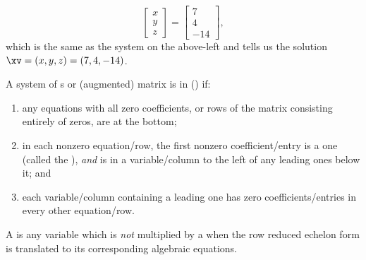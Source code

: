 \begin{example}
\begin{solution}
\begin{equation*}
\begin{bmatrix} x\\y\\z \end{bmatrix}
=\begin{bmatrix} 7\\4\\-14 \end{bmatrix},
\end{equation*}
which is the same as the system on the above-left and tells us the solution \(\xv=(x,y,z)=(7,4,-14)\).
\end{solution}
\end{example}





\begin{definition} \label{def:rref} 
 A system of s or (augmented) matrix is in  (\rref) if:
  \begin{enumerate}
\item any equations with all zero coefficients, or rows of the matrix consisting entirely of zeros, are at the bottom; 
\item in each nonzero equation\slash row, the first nonzero coefficient\slash entry is a one (called the ), \emph{and} is in a variable\slash column to the left of any leading ones below it;
and
\item each variable\slash column containing a leading one has zero coefficients\slash entries in every other equation\slash row.\end{enumerate}
A  is any variable which is \emph{not} multiplied by a  when the row reduced echelon form is translated to its corresponding algebraic equations.
\end{definition}


